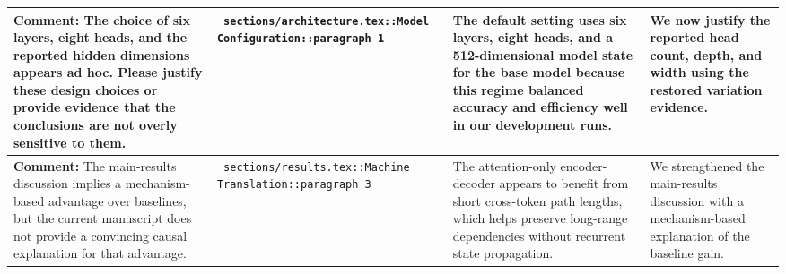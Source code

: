 \documentclass[11pt]{article}
\begin{document}
\begin{longtable}{|p{}|p{}|p{}|p{}|}
\hline
\textbf{Comment:} The choice of six layers, eight heads, and the reported hidden dimensions appears ad hoc. Please justify these design choices or provide evidence that the conclusions are not overly sensitive to them. & \texttt{ sections/architecture.tex::Model Configuration::paragraph 1 } & {\color{blue}\ttfamily The default setting uses six layers, eight heads, and a 512-dimensional model state for the base model because this regime balanced accuracy and efficiency well in our development runs.} & We now justify the reported head count, depth, and width using the restored variation evidence. \\
\hline
\textbf{Comment:} The main-results discussion implies a mechanism-based advantage over baselines, but the current manuscript does not provide a convincing causal explanation for that advantage. & \texttt{ sections/results.tex::Machine Translation::paragraph 3 } & {\color{blue}\ttfamily The attention-only encoder-decoder appears to benefit from short cross-token path lengths, which helps preserve long-range dependencies without recurrent state propagation.} & We strengthened the main-results discussion with a mechanism-based explanation of the baseline gain. \\
\hline
\end{longtable}
\end{document}
